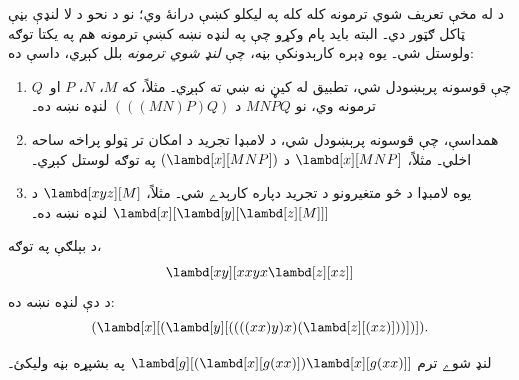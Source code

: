 \documentclass[../../../include/open-logic-section]{subfiles}
\begin{document}

د  له مخې تعريف شوي ترمونه کله کله په ليکلو
کښې درانۀ وي؛ نو د نحو د لا لنډې بڼې ټاکل ګټور دي۔ البته بايد پام
وکړو چې په لنډه نښه کښې ترمونه هم په يکتا توګه ولوستل شي۔ يوه ډېره
کارېدونکې بڼه، چې \emph{لنډ شوي ترمونه} بلل کېږي، داسې ده:

\begin{enumerate}
\item چې قوسونه پرېښودل شي، تطبيق له کيڼ نه ښي ته کېږي۔ مثلاً، که
  $M$، $N$، $P$ او~$Q$ ترمونه وي، نو $MNPQ$ د $(((MN)P)Q)$
  لنډه نښه ده۔
\item همداسې، چې قوسونه پرېښودل شي، د لامبډا تجريد د امکان تر
  ټولو پراخه ساحه اخلي۔ مثلاً، $\lambd[x][MNP]$ د
  $(\lambd[x][MNP])$ په توګه لوستل کېږي۔
\item يوه لامبډا د څو متغيرونو د تجريد دپاره کارېدے شي۔ مثلاً،
  $\lambd[xyz][M]$ د $\lambd[x][\lambd[y][\lambd[z][M]]]$
  لنډه نښه ده۔
\end{enumerate}

د بېلګې په توګه،
\[
\lambd[xy][xxyx \lambd[z][xz]]
\]
د دې لنډه نښه ده:
\[
(\lambd[x][(\lambd[y][((((xx)y)x)(\lambd[z][(xz)]))])]).
\]

\begin{prob}
لنډ شوے ترم $\lambd[g][(\lambd[x][g (x x)])
  \lambd[x][g (x x)]]$ په بشپړه بڼه وليکئ۔
\end{prob}
\end{document}
